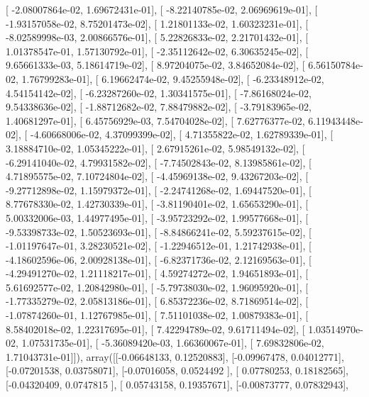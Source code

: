 \documentclass{article}
\begin{document}
       [ -2.08007864e-02,   1.69672431e-01],
       [ -8.22140785e-02,   2.06969619e-01],
       [ -1.93157058e-02,   8.75201473e-02],
       [  1.21801133e-02,   1.60323231e-01],
       [ -8.02589998e-03,   2.00866576e-01],
       [  5.22826833e-02,   2.21701432e-01],
       [  1.01378547e-01,   1.57130792e-01],
       [ -2.35112642e-02,   6.30635245e-02],
       [  9.65661333e-03,   5.18614719e-02],
       [  8.97204075e-02,   3.84652084e-02],
       [  6.56150784e-02,   1.76799283e-01],
       [  6.19662474e-02,   9.45255948e-02],
       [ -6.23348912e-02,   4.54154142e-02],
       [ -6.23287260e-02,   1.30341575e-01],
       [ -7.86168024e-02,   9.54338636e-02],
       [ -1.88712682e-02,   7.88479882e-02],
       [ -3.79183965e-02,   1.40681297e-01],
       [  6.45756929e-03,   7.54704028e-02],
       [  7.62776377e-02,   6.11943448e-02],
       [ -4.60668006e-02,   4.37099399e-02],
       [  4.71355822e-02,   1.62789339e-01],
       [  3.18884710e-02,   1.05345222e-01],
       [  2.67915261e-02,   5.98549132e-02],
       [ -6.29141040e-02,   4.79931582e-02],
       [ -7.74502843e-02,   8.13985861e-02],
       [  4.71895575e-02,   7.10724804e-02],
       [ -4.45969138e-02,   9.43267203e-02],
       [ -9.27712898e-02,   1.15979372e-01],
       [ -2.24741268e-02,   1.69447520e-01],
       [  8.77678330e-02,   1.42730339e-01],
       [ -3.81190401e-02,   1.65653290e-01],
       [  5.00332006e-03,   1.44977495e-01],
       [ -3.95723292e-02,   1.99577668e-01],
       [ -9.53398733e-02,   1.50523693e-01],
       [ -8.84866241e-02,   5.59237615e-02],
       [ -1.01197647e-01,   3.28230521e-02],
       [ -1.22946512e-01,   1.21742938e-01],
       [ -4.18602596e-06,   2.00928138e-01],
       [ -6.82371736e-02,   2.12169563e-01],
       [ -4.29491270e-02,   1.21118217e-01],
       [  4.59274272e-02,   1.94651893e-01],
       [  5.61692577e-02,   1.20842980e-01],
       [ -5.79738030e-02,   1.96095920e-01],
       [ -1.77335279e-02,   2.05813186e-01],
       [  6.85372236e-02,   8.71869514e-02],
       [ -1.07874260e-01,   1.12767985e-01],
       [  7.51101038e-02,   1.00879383e-01],
       [  8.58402018e-02,   1.22317695e-01],
       [  7.42294789e-02,   9.61711494e-02],
       [  1.03514970e-02,   1.07531735e-01],
       [ -5.36089420e-03,   1.66360067e-01],
       [  7.69832806e-02,   1.71043731e-01]]), array([[-0.06648133,  0.12520883],
       [-0.09967478,  0.04012771],
       [-0.07201538,  0.03758071],
       [-0.07016058,  0.0524492 ],
       [ 0.07780253,  0.18182565],
       [-0.04320409,  0.0747815 ],
       [ 0.05743158,  0.19357671],
       [-0.00873777,  0.07832943],
\end{document}

